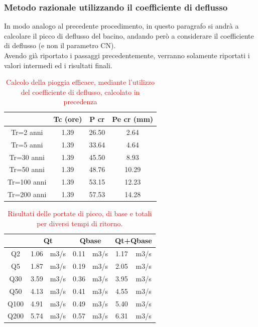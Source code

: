 \subsubsection{Metodo razionale utilizzando il coefficiente di deflusso}
In modo analogo al precedente procedimento, in questo paragrafo si andrà a calcolare il picco di deflusso del bacino, andando però a considerare il coefficiente di deflusso (e non il parametro CN).\\
Avendo già riportato i passaggi precedentemente, verranno solamente riportati i valori intermedi ed i risultati finali.
\begin{table}[H] \centering
    \caption{\textcolor{red}{Calcolo della pioggia efficace, mediante l'utilizzo del coefficiente di deflusso, calcolato in precedenza}}
    \begin{tabular}{cccc}
        \toprule
                & Tc (ore) & P cr  & Pe cr (mm) \\
        \midrule
    Tr=2 anni   & 1.39     & 26.50 & 2.64       \\
    Tr=5 anni   & 1.39     & 33.64 & 4.64       \\
    Tr=30 anni  & 1.39     & 45.50 & 8.93       \\
    Tr=50 anni  & 1.39     & 48.76 & 10.29      \\
    Tr=100 anni & 1.39     & 53.15 & 12.23      \\
    Tr=200 anni & 1.39     & 57.53 & 14.28      \\
    \bottomrule
    \end{tabular}
    \end{table}

\begin{table}[H] \centering
        \caption{\textcolor{red}{Risultati delle portate di picco, di base e totali per diversi tempi di ritorno.}}
        \begin{tabular}{ccccccc}
            \toprule
        & \multicolumn{2}{c}{Qt} & \multicolumn{2}{c}{Qbase} & \multicolumn{2}{c}{Qt+Qbase} \\
        \midrule
        Q2   & 1.06       & m3/s      & 0.11        & m3/s        & 1.17          & m3/s         \\
        Q5   & 1.87       & m3/s      & 0.19        & m3/s        & 2.05          & m3/s         \\
        Q30  & 3.59       & m3/s      & 0.36        & m3/s        & 3.95          & m3/s         \\
        Q50  & 4.13       & m3/s      & 0.41        & m3/s        & 4.55          & m3/s         \\
        Q100 & 4.91       & m3/s      & 0.49        & m3/s        & 5.40          & m3/s         \\
        Q200 & 5.74       & m3/s      & 0.57        & m3/s        & 6.31          & m3/s    \\
        \bottomrule    
        \end{tabular}
\end{table}

